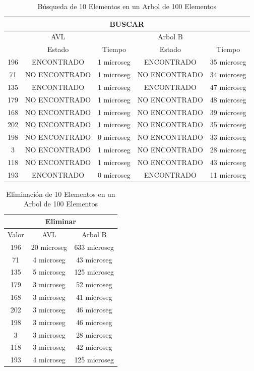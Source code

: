 \documentclass[acmsmall]{acmart}
\begin{document}
\begin{table}[hbp]
\begin{center}
  \caption{Búsqueda de 10 Elementos en un Arbol de 100 Elementos}
  \begin{tabular}{ccccc}
    \toprule
    \multicolumn{5}{c}{BUSCAR}\\
    \midrule
     \, & AVL &\, & Arbol B & \,\\
     \, &Estado&Tiempo&Estado&Tiempo \\
      196 &ENCONTRADO&1 microseg&ENCONTRADO&35 microseg \\
      71 &NO ENCONTRADO&1 microseg&NO ENCONTRADO&34 microseg \\
      135 &ENCONTRADO&1 microseg&ENCONTRADO&47 microseg \\
      179 &NO ENCONTRADO&1 microseg&NO ENCONTRADO&48 microseg \\
      168 &NO ENCONTRADO&1 microseg&NO ENCONTRADO&39 microseg \\
      202 &NO ENCONTRADO&1 microseg&NO ENCONTRADO&35 microseg \\
      198 &NO ENCONTRADO&0 microseg&NO ENCONTRADO&33 microseg \\
      3 &NO ENCONTRADO&1 microseg&NO ENCONTRADO&28 microseg \\
       118 &NO ENCONTRADO&1 microseg&NO ENCONTRADO&43 microseg \\
      193 &ENCONTRADO&0 microseg&ENCONTRADO&11 microseg \\

    \bottomrule
  \end{tabular}
  \end{center}
\end{table}


\begin{table}[htbp]
\begin{center}
  \caption{Eliminación de 10 Elementos en un Arbol de 100 Elementos}
  \begin{tabular}{ccc}
    \toprule
    \multicolumn{3}{c}{Eliminar}\\
    \midrule
     Valor & AVL & Arbol B\\
      196 &20 microseg&633 microseg\\
      71 & 4 microseg&43 microseg\\
      135 &5 microseg &125 microseg\\
      179 &3 microseg&52 microseg\\
      168 & 3 microseg&41 microseg\\
      202 &3 microseg&46 microseg\\
      198 &3 microseg&46 microseg\\
      3 &3 microseg&28 microseg\\
       118 &3 microseg&42 microseg\\
      193 &4 microseg&125 microseg\\
    \bottomrule
  \end{tabular}
  \end{center}
\end{table}
\end{document}
